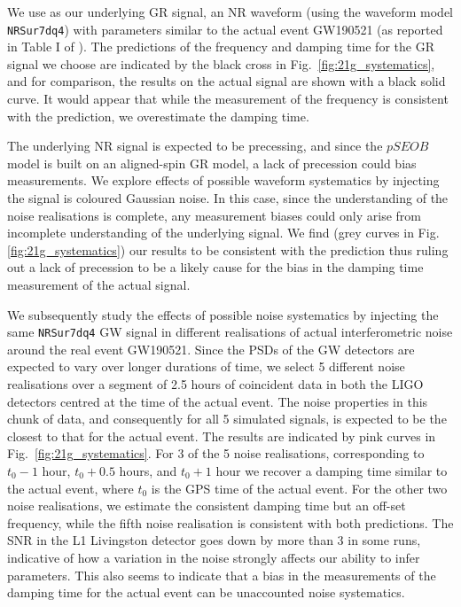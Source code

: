 \documentclass[twocolumn,prd,superscriptaddress,amsfonts,amssymb,amsmath,preprintnumbers]{revtex4-1}
\begin{document}
We use as our underlying GR signal, an NR waveform (using the waveform model \texttt{NRSur7dq4}) with parameters similar to the actual event GW190521 (as reported in Table I of \cite{Abbott:2020tfl}). The predictions of the frequency and damping time for the GR signal we choose are indicated by the black cross in Fig.~\ref{fig:21g_systematics}, and for comparison, the results on the actual signal are shown with a black solid curve. It would appear that while the measurement of the frequency is consistent with the prediction, we overestimate the damping time. 

The underlying NR signal is expected to be precessing, and since the $pSEOB$ model is built on an aligned-spin GR model, a lack of precession could bias measurements. We explore effects of possible waveform systematics by injecting the signal is coloured Gaussian noise. In this case, since the understanding of the noise realisations is complete, any measurement biases could only arise from incomplete understanding of the underlying signal. We find (grey curves in Fig.\ref{fig:21g_systematics}) our results to be consistent with the prediction thus ruling out a lack of precession to be a likely cause for the bias in the damping time measurement of the actual signal.

We subsequently study the effects of possible noise systematics by injecting the same \texttt{NRSur7dq4} GW signal in different realisations of actual interferometric noise around the real event GW190521. Since the PSDs of the GW detectors are expected to vary over longer durations of time, we select 5 different noise realisations over a segment of 2.5 hours of coincident data in both the LIGO detectors centred at the time of the actual event. The noise properties in this chunk of data, and consequently for all 5 simulated signals, is expected to be the closest to that for the actual event. The results are indicated by pink curves in Fig.~\ref{fig:21g_systematics}. For 3 of the 5 noise realisations, corresponding to $t_0-1$ hour, $t_0+0.5$ hours, and $t_0+1$ hour we recover a damping time similar to the actual event, where $t_0$ is the GPS time of the actual event. For the other two noise realisations, we estimate the consistent damping time but an off-set frequency, while the fifth noise realisation is consistent with both predictions. The SNR in the L1 Livingston detector goes down by more than 3 in some runs, indicative of how a variation in the noise strongly affects our ability to infer parameters. This also seems to indicate that a bias in the measurements of the damping time for the actual event can be unaccounted noise systematics.
\end{document}
